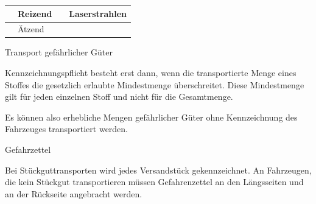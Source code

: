 \documentclass{article}
\begin{document}
\begin{center}
\begin{tabular}{|m{3.225cm}m{3.225cm}|m{3.225cm}m{3.225cm}|}
 &
{\mdseries Reizend}

 &
{\centering   [Warning: Image ignored]
 \par}

 &
{\mdseries Laserstrahlen}

\\\hline
{\centering   [Warning: Image ignored]
 \par}

 &
{\mdseries \"Atzend}

 &
 &
\\\hline
\end{tabular}
\end{center}
{\mdseries\color[rgb]{0.0,0.0,0.5019608}
Transport gef\"ahrlicher G\"uter}

{\mdseries
Kennzeichnungspflicht besteht erst dann, wenn die transportierte Menge
eines Stoffes die gesetzlich erlaubte Mindestmenge \"uberschreitet.
Diese Mindestmenge gilt f\"ur jeden einzelnen Stoff und nicht f\"ur die
Gesamtmenge.}

{\mdseries
Es k\"onnen also erhebliche Mengen gef\"ahrlicher G\"uter ohne
Kennzeichnung des Fahrzeuges transportiert werden. }

{\mdseries\color{black}
Gefahrzettel}

{\mdseries
Bei St\"uckguttransporten wird jedes Versandst\"uck gekennzeichnet. An
Fahrzeugen, die kein St\"uckgut transportieren m\"ussen Gefahrenzettel
an den L\"angsseiten und an der R\"uckseite angebracht werden.}
\end{document}
